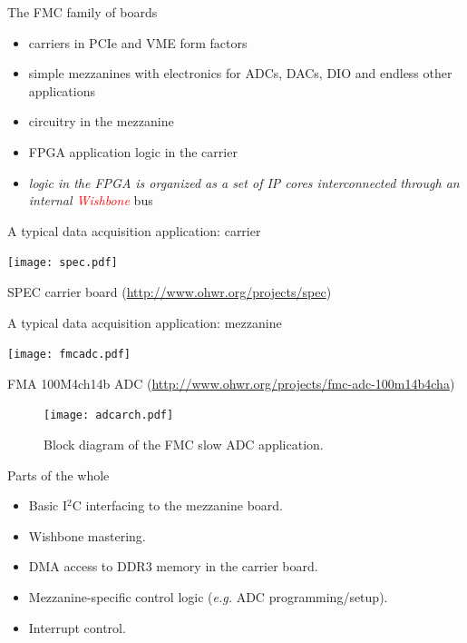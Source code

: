 \documentclass[compress,red]{beamer}
\begin{document}
\begin{frame}{The FMC family of boards}
\begin{itemize}
\item carriers in PCIe and VME form factors
\item simple mezzanines with electronics for ADCs, DACs, DIO and endless
    other applications
\item circuitry in the mezzanine
\item FPGA application logic in the carrier
\item \emph{logic in the FPGA is organized as a set of IP cores
    interconnected through an internal \textcolor{red}{Wishbone}}
    bus
\end{itemize}
\end{frame}
\begin{frame}{A typical data acquisition application: carrier}
\begin{center}
\texttt{[image: spec.pdf]}
\end{center}
\centering
SPEC carrier board (\url{http://www.ohwr.org/projects/spec})
\end{frame}

\begin{frame}{A typical data acquisition application: mezzanine}
\begin{center}
\texttt{[image: fmcadc.pdf]}
\end{center}
\centering
FMA 100M4ch14b ADC
(\url{http://www.ohwr.org/projects/fmc-adc-100m14b4cha})
\end{frame}

\begin{frame}
\begin{figure}[t]
   \centering
   \texttt{[image: adcarch.pdf]}
   \caption{Block diagram of the FMC slow ADC application.}
   \label{slow-adc}
\end{figure}
\end{frame}

\begin{frame}{Parts of the whole}
\begin{itemize}
\item Basic I${}^2$C interfacing to the mezzanine board.
\item Wishbone mastering.
\item DMA access to DDR3 memory in the carrier board.
\item Mezzanine-specific control logic (\emph{e.g.} ADC programming/setup).
\item Interrupt control.
\end{itemize}
\end{frame}
\end{document}
